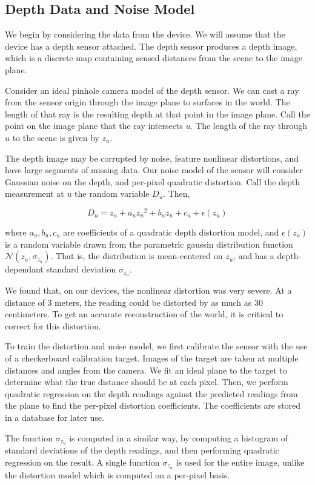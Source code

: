\documentclass[conference,10pt]{IEEEtran}
\begin{document}
\subsection{Depth Data and Noise Model}
We begin by considering the data from the device. We will assume that the device
has a depth sensor attached. The depth sensor produces a depth image, which is
a discrete map containing sensed distances from the scene to the image plane.

Consider an ideal pinhole camera model of the depth sensor. We can cast a ray
from the sensor origin through the image plane to surfaces in the world. The
length of that ray is the resulting depth at that point in the image plane. Call
the point on the image plane that the ray intersects $u$. The length of the ray
through $u$ to the scene is given by $z_u$. 

The depth image may be corrupted by noise, feature nonlinear distortions, and
have large segments of missing data. Our noise model of the sensor will consider
Gaussian noise on the depth, and per-pixel quadratic distortion. Call the depth
 measurement at $u$ the random variable $D_u$. Then,
 
 $$ D_u = z_u + a_u{z_u}^2 + b_u z_u + c_u + \epsilon(z_u)$$
 
 \noindent where $a_u, b_u, c_u$ are coefficients of a quadratic depth
 distortion model, and $\epsilon(z_u)$ is a random variable drawn from the
 parametric gaussin distribution function $\mathcal{N}(z_u, \sigma_{z_u})$. 
 That is, the distribution is mean-centered on $z_u$, and has a depth-dependant
 standard deviation $\sigma_{z_u}$.
 
 We found that, on our devices, the nonlinear distortion was very severe. At a
distance of 3 meters, the reading could be distorted by as much as 30
centimeters. To get an accurate reconstruction of the world, it is critical to
correct for this distortion.
 
 To train the distortion and noise model, we first calibrate the sensor with the
 use of a checkerboard calibration target. Images of the target are taken at
 multiple distances and angles from the camera. We fit an ideal plane to the
 target to determine what the true distance should be at each pixel. Then, we
perform quadratic regression on the depth readings against the predicted
readings from the plane to find the per-pixel distortion coefficients. The
coefficients are stored in a database for later use.

The function $\sigma_{z_u}$ is computed in a similar way, by computing a
histogram of standard deviations of the depth readings, and then performing
quadratic regression on the result. A single function $\sigma_{z_u}$ is used for
the entire image, unlike the distortion model which is computed on a per-pixel
basis.
\end{document}

